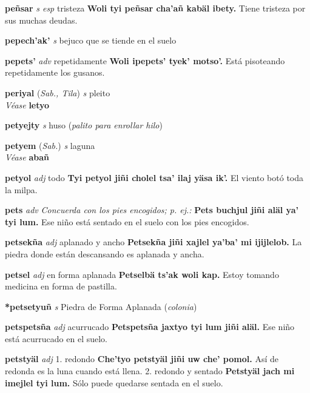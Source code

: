 \documentclass[10pt]{scrbook}
\newcommand{\entry}[1]{\textbf{#1}}
\newcommand{\onedefinition}[1]{#1.}
\newcommand{\nontranslationdef}[1]{\textit{#1}}
\newcommand{\partofspeech}[1]{\textit{#1}}
\newcommand{\spanishtranslation}[1]{#1}
\newcommand{\clarification}[1]{(\textit{#1})}
\newcommand{\cholexample}[1]{\textbf{#1}}
\newcommand{\exampletranslation}[1]{#1}
\newcommand{\alsosee}[1]{\\\textit{Véase} \textbf{#1}}
\newcommand{\relevantdialect}[1]{(\textit{#1})}
\begin{document}
\begin{multicols}{2}
\entry{peñsar}
\partofspeech{s esp}
\spanishtranslation{tristeza}
\cholexample{Woli tyi peñsar cha'añ kabäl ibety.}
\exampletranslation{Tiene tristeza por sus muchas deudas.}

\entry{pepech'ak'}
\partofspeech{s}
\spanishtranslation{bejuco que se tiende en el suelo}

\entry{pepets'}
\partofspeech{adv}
\spanishtranslation{repetidamente}
\cholexample{Woli ipepets' tyek' motso'.}
\exampletranslation{Está pisoteando repetidamente los gusanos.}

\entry{periyal}
\relevantdialect{Sab., Tila}
\partofspeech{s}
\spanishtranslation{pleito}
\alsosee{letyo}

\entry{petyejty}
\partofspeech{s}
\spanishtranslation{huso}
\clarification{palito para enrollar hilo}

\entry{petyem}
\relevantdialect{Sab.}
\partofspeech{s}
\spanishtranslation{laguna}
\alsosee{abañ}

\entry{petyol}
\partofspeech{adj}
\spanishtranslation{todo}
\cholexample{Tyi petyol jiñi cholel tsa' ilaj yäsa ik'.}
\exampletranslation{El viento botó toda la milpa.}

\entry{pets}
\partofspeech{adv}
\nontranslationdef{Concuerda con los pies encogidos; p. ej.:}
\cholexample{Pets buchjul jiñi aläl ya' tyi lum.}
\exampletranslation{Ese niño está sentado en el suelo con los pies encogidos.}

\entry{petsekña}
\partofspeech{adj}
\spanishtranslation{aplanado y ancho}
\cholexample{Petsekña jiñi xajlel ya'ba' mi ijijlelob.}
\exampletranslation{La piedra donde están descansando es aplanada y ancha.}

\entry{petsel}
\partofspeech{adj}
\spanishtranslation{en forma aplanada}
\cholexample{Petselbä ts'ak woli kap.}
\exampletranslation{Estoy tomando medicina en forma de pastilla.}

\entry{*petsetyuñ}
\partofspeech{s}
\spanishtranslation{Piedra de Forma Aplanada}
\clarification{colonia}

\entry{petspetsña}
\partofspeech{adj}
\spanishtranslation{acurrucado}
\cholexample{Petspetsña jaxtyo tyi lum jiñi aläl.}
\exampletranslation{Ese niño está acurrucado en el suelo.}

\entry{petstyäl}
\partofspeech{adj}
\onedefinition{1}
\spanishtranslation{redondo}
\cholexample{Che'tyo petstyäl jiñi uw che' pomol.}
\exampletranslation{Así de redonda es la luna cuando está llena.}
\onedefinition{2}
\spanishtranslation{redondo y sentado}
\cholexample{Petstyäl jach mi imejlel tyi lum.}
\exampletranslation{Sólo puede quedarse sentada en el suelo.}


\end{multicols}
\end{document}
